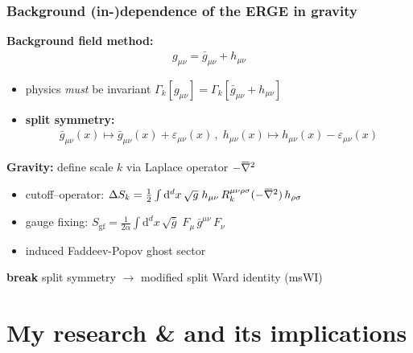 \documentclass[]{beamer}  %
\newcommand{\overbar}[1]{\mkern 1.5mu\overline{\mkern-1.5mu#1\mkern-1.5mu}\mkern 1.5mu}
\newcommand{\bnabla}{\overbar \nabla}
\begin{document}
\begin{frame}
  \frametitle{Background (in-)dependence of the ERGE in gravity}
  \textbf{Background field method:}
  \begin{align*}
    \boxed{
      g_{\mu\nu} = \bar{g}_{\mu\nu} + h_{\mu\nu}
    }
  \end{align*}
  \begin{itemize}
    \item physics \textit{must} be invariant $\Gamma_k[g_{\mu\nu}] = \Gamma_k[\bar{g}_{\mu\nu} + h_{\mu\nu}]$
    \item \textbf{split symmetry:}
      \begin{align*}
        \boxed{
          \bar g_{\mu\nu}(x) \mapsto \bar g_{\mu\nu}(x) + \varepsilon_{\mu\nu}(x) \,, \;
          h_{\mu\nu}(x) \mapsto h_{\mu\nu}(x) - \varepsilon_{\mu\nu}(x)
        }
      \end{align*}
  \end{itemize}
  \pause
  \textbf{Gravity:} define scale $k$ via Laplace operator $-\bnabla^2$\\[5pt]
  \vspace{5pt}
  \begin{itemize}
    \item cutoff--operator:
      $\Delta S_k = \frac 12 \int \mathrm d^d x \, \sqrt{g} \;
      h_{\mu\nu} \, R_k^{\mu\nu\rho\sigma}(-\bnabla^2) \, h_{\rho\sigma} $\\[3pt]
    \item gauge fixing:
      $S_{\mathrm{gf}} = \frac{1}{2\alpha} \int \mathrm d^dx \, \sqrt{\bar g} \;
      F_\mu \, \bar g^{\mu\nu} \, F_\nu$\\[5pt]
    \item induced Faddeev-Popov ghost sector
  \end{itemize}
  \vspace{10pt}
  \textbf{break} split symmetry $\rightarrow$ modified split Ward identity (msWI)
\end{frame}


\section{My research \& and its implications}

\end{document}
